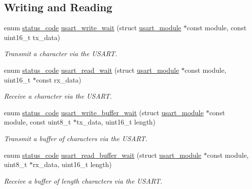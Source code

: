 \subsection*{Writing and Reading}
\begin{DoxyCompactItemize}
\item 
enum \hyperlink{group__group__sam0__utils__status__codes_ga751c892e5a46b8e7d282085a5a5bf151}{status\+\_\+code} \hyperlink{group__asfdoc__sam0__sercom__usart__group_gaee8b142e8ad13e1e226334a9954e853c}{usart\+\_\+write\+\_\+wait} (struct \hyperlink{structusart__module}{usart\+\_\+module} $\ast$const module, const uint16\+\_\+t tx\+\_\+data)
\begin{DoxyCompactList}\small\item\em Transmit a character via the U\+S\+A\+R\+T. \end{DoxyCompactList}\item 
enum \hyperlink{group__group__sam0__utils__status__codes_ga751c892e5a46b8e7d282085a5a5bf151}{status\+\_\+code} \hyperlink{group__asfdoc__sam0__sercom__usart__group_gaf7db90c51a6f17edff5f1de2a0e3d8a5}{usart\+\_\+read\+\_\+wait} (struct \hyperlink{structusart__module}{usart\+\_\+module} $\ast$const module, uint16\+\_\+t $\ast$const rx\+\_\+data)
\begin{DoxyCompactList}\small\item\em Receive a character via the U\+S\+A\+R\+T. \end{DoxyCompactList}\item 
enum \hyperlink{group__group__sam0__utils__status__codes_ga751c892e5a46b8e7d282085a5a5bf151}{status\+\_\+code} \hyperlink{group__asfdoc__sam0__sercom__usart__group_gacffd0845249348d37d14c65a41132e41}{usart\+\_\+write\+\_\+buffer\+\_\+wait} (struct \hyperlink{structusart__module}{usart\+\_\+module} $\ast$const module, const uint8\+\_\+t $\ast$tx\+\_\+data, uint16\+\_\+t length)
\begin{DoxyCompactList}\small\item\em Transmit a buffer of characters via the U\+S\+A\+R\+T. \end{DoxyCompactList}\item 
enum \hyperlink{group__group__sam0__utils__status__codes_ga751c892e5a46b8e7d282085a5a5bf151}{status\+\_\+code} \hyperlink{group__asfdoc__sam0__sercom__usart__group_ga4f788b3478e9c1fa8f0dd8d09939d3a6}{usart\+\_\+read\+\_\+buffer\+\_\+wait} (struct \hyperlink{structusart__module}{usart\+\_\+module} $\ast$const module, uint8\+\_\+t $\ast$rx\+\_\+data, uint16\+\_\+t length)
\begin{DoxyCompactList}\small\item\em Receive a buffer of {\ttfamily length} characters via the U\+S\+A\+R\+T. \end{DoxyCompactList}\end{DoxyCompactItemize}


